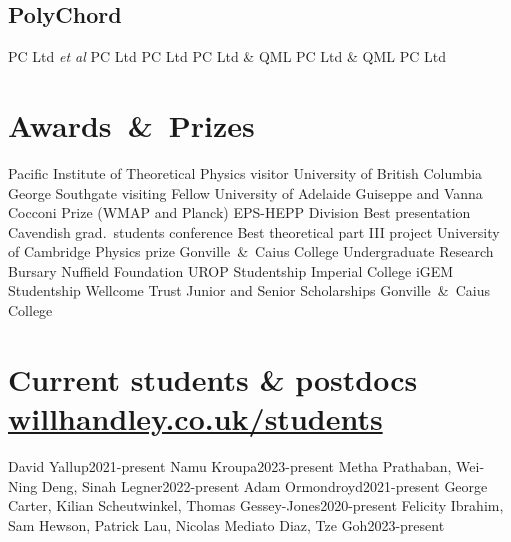 \documentclass[11pt,a4paper,sans]{moderncv}
\begin{document}
\subsection{PolyChord}
 {PC Ltd \textit{et al}}{}{}
 {PC Ltd}{}{}
 {PC Ltd}{}{}
 {PC Ltd \& QML}{}{}
 {PC Ltd \& QML}{}{}
 {}{}{}
 {PC Ltd}{}{}
 {}{}{}
 {}{}{}
 {}{}{}

\section{Awards~\&~Prizes}
  {Pacific Institute of Theoretical Physics visitor}         {University of British Columbia}
  {George Southgate visiting Fellow}         {University of Adelaide}
  {Guiseppe and Vanna Cocconi Prize (WMAP and Planck)}         {EPS-HEPP Division}
  {Best presentation}                 {Cavendish grad.\ students conference}
  {Best theoretical part III project} {University of Cambridge} 
\cvitemwithcomment{}            {Physics prize}                     {Gonville~\&~Caius College} 
 {Undergraduate Research Bursary}    {Nuffield Foundation}  
\cvitemwithcomment{}            {UROP Studentship}                  {Imperial College} 
 {iGEM Studentship}                  {Wellcome Trust} 
    {Junior and Senior Scholarships}    {Gonville~\&~Caius College} 

\pagebreak
\section{Current students \& postdocs \hfill\href{https://www.willhandley.co.uk/students}{willhandley.co.uk/students}}
  {David Yallup}{2021-present}
 {Namu Kroupa}{2023-present}
\cvitemwithcomment{} {Metha Prathaban, Wei-Ning Deng, Sinah Legner}{2022-present}
\cvitemwithcomment{}  {Adam Ormondroyd}{2021-present}
\cvitemwithcomment{}  {George Carter, Kilian Scheutwinkel, Thomas Gessey-Jones}{2020-present}
  {Felicity Ibrahim, Sam Hewson, Patrick Lau, Nicolas Mediato Diaz, Tze Goh}{2023-present}
\end{document}
